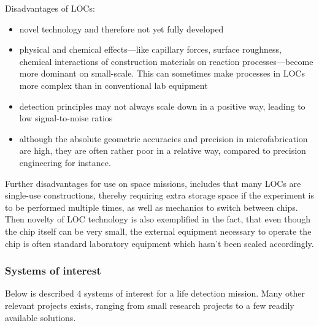 Disadvantages of LOCs:
\begin{itemize}
    \item novel technology and therefore not yet fully developed
    \item physical and chemical effects—like capillary forces, surface roughness, chemical interactions of construction materials on reaction processes—become more dominant on small-scale. This can sometimes make processes in LOCs more complex than in conventional lab equipment
    \item detection principles may not always scale down in a positive way, leading to low signal-to-noise ratios
    \item although the absolute geometric accuracies and precision in microfabrication are high, they are often rather poor in a relative way, compared to precision engineering for instance.
\end{itemize}
Further disadvantages for use on space missions, includes that many LOCs are single-use constructions, thereby requiring extra storage space if the experiment is to be performed multiple times, as well as mechanics to switch between chips. Then novelty of LOC technology is also exemplified in the fact, that even though the chip itself can be very small, the external equipment necessary to operate the chip is often standard laboratory equipment which hasn’t been scaled accordingly.

\subsubsection{Systems of interest}
Below is described 4 systems of interest for a life detection mission. Many other relevant projects exists, ranging from small research projects to a few readily available solutions.

